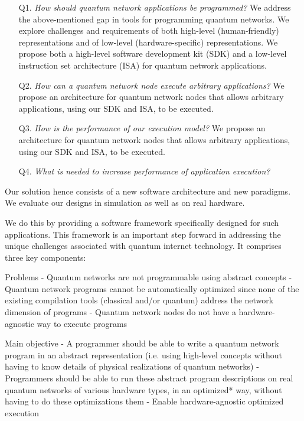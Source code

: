 \begin{itemize}
  \item[Q1.] \textit{How should quantum network applications be programmed?}
    We address the above-mentioned gap in tools for programming quantum networks. 
    We explore challenges and requirements of both high-level (human-friendly) representations and of low-level (hardware-specific) representations.
    We propose both a high-level software development kit (SDK) and a low-level instruction set architecture (ISA) for quantum network applications.
  \item[Q2.] \textit{How can a quantum network node execute arbitrary applications?}
    We propose an architecture for quantum network nodes that allows arbitrary applications, using our SDK and ISA, to be executed.
  \item[Q3.] \textit{How is the performance of our execution model?}
    We propose an architecture for quantum network nodes that allows arbitrary applications, using our SDK and ISA, to be executed.
  \item[Q4.] \textit{What is needed to increase performance of application execution?}
\end{itemize}

Our solution hence consists of a new software architecture and new paradigms.
We evaluate our designs in simulation as well as on real hardware.

We do this by providing a software framework specifically designed for such applications.
This framework is an important step forward in addressing the unique challenges associated with quantum internet technology.
It comprises three key components:


Problems
- Quantum networks are not programmable using abstract concepts
- Quantum network programs cannot be automatically optimized since none of the existing compilation tools (classical and/or quantum) address the network dimension of programs
- Quantum network nodes do not have a hardware-agnostic way to execute programs

Main objective
- A programmer should be able to write a quantum network program in an abstract representation (i.e. using high-level concepts without having to know details of physical realizations of quantum networks)
- Programmers should be able to run these abstract program descriptions on real quantum networks of various hardware types, in an optimized* way, without having to do these optimizations them
- Enable hardware-agnostic optimized execution

